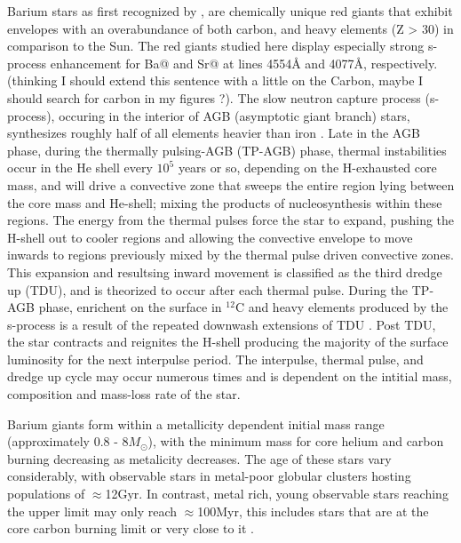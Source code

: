 \documentclass[a4paper,fleqn,usenatbib]{mnras}
\makeatletter
\newcommand{\Rmnum}[1]{\expandafter\@slowromancap\romannumeral #1@}
\makeatother
\begin{document}
Barium stars as first recognized by \citet{Bidelman1951}, are chemically unique red giants that exhibit envelopes with an overabundance of both carbon, and heavy elements (Z > 30) in comparison to the Sun. The red giants studied here display especially strong s-process enhancement for Ba\Rmnum{2} and Sr\Rmnum{2} at lines 4554\AA \hspace{0.2mm} and 4077\AA, respectively. (thinking I should extend this sentence with a little on the Carbon, maybe I should search for carbon in my figures ?). The slow neutron capture process (s-process), occuring in the interior of AGB (asymptotic giant branch) stars, synthesizes roughly half of all elements heavier than iron \citep[e.g.][]{busso1999,travaglio2001,
herwig2005,romano2010,kobayashi2011,prantzos2012,bisterzo2014,
karakas12016}. Late in the AGB phase, during the thermally pulsing-AGB (TP-AGB) phase, thermal instabilities occur in the He shell every $10^5$ years or so, depending on the H-exhausted core mass, and will drive a convective zone that sweeps the entire region lying between the core mass and He-shell; mixing the products of nucleosynthesis within these regions. The energy from the thermal pulses force the star to expand, pushing the H-shell out to cooler regions and allowing the convective envelope to move inwards to regions previously mixed by the thermal pulse driven convective zones. This expansion and resultsing inward movement is classified as the third dredge up (TDU), and is theorized to occur after each thermal pulse. During the TP-AGB phase, enrichent on the surface in $^{12}$C and heavy elements produced by the s-process is a result of the repeated downwash extensions of TDU \citep[e.g.][]{busso2001}. Post TDU, the star contracts and reignites the H-shell producing the majority of the surface luminosity for the next interpulse period. The interpulse, thermal pulse, and dredge up cycle may occur numerous times and is dependent on the intitial mass, composition and mass-loss rate of the star.

Barium giants form within a metallicity dependent initial mass range (approximately 0.8 - 8$M_{\odot}$), with the minimum mass for core helium and carbon burning decreasing as metalicity decreases. The age of these stars vary considerably, with observable stars in metal-poor globular clusters hosting populations of $\approx$12Gyr. In contrast, metal rich, young observable stars reaching the upper limit may only reach $\approx$100Myr, this includes stars that are at the core carbon burning limit or very close to it \citep[e.g.][]{whitelock2013}.
\end{document}
